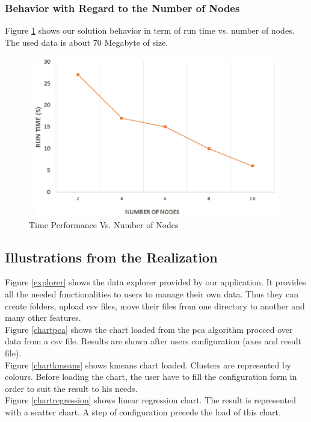 \subsubsection{Behavior with Regard to the Number of Nodes}
Figure \ref{nodes} shows our solution behavior in term of run time vs. number of nodes. The used data is about 70 Megabyte of size.
\begin{figure}[H]
\begin{center}
\includegraphics[width=13cm,height=7cm]{chapter5/nodes.png}
\end{center}
\caption{Time Performance Vs. Number of Nodes}
\label{nodes}
\end{figure}
\subsection{Illustrations from the Realization}

Figure \ref{explorer} shows the data explorer provided by our application. It provides all the needed functionalities to users to manage their own data. Thus they can create folders, upload csv files, move their files from one directory to another and many other features.\\

Figure \ref{chartpca} shows the chart loaded from the pca algorithm procced over data from a csv file. Results are shown after users configuration (axes and result file).\\

Figure \ref{chartkmeans} shows kmeans chart loaded. Clusters are represented by colours. Before loading the chart, the user have to fill the configuration form in order to suit the result to his needs.\\

Figure \ref{chartregression} shows linear regression chart. The result is represented with a scatter chart. A step of configuration precede the load of this chart.\\

